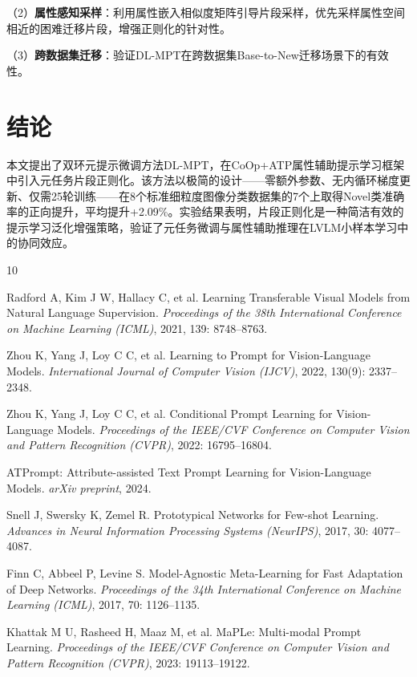 \documentclass[10pt,a4paper]{ctexart}
\begin{document}
（2）\textbf{属性感知采样}：利用属性嵌入相似度矩阵引导片段采样，优先采样属性空间相近的困难迁移片段，增强正则化的针对性。

（3）\textbf{跨数据集迁移}：验证DL-MPT在跨数据集Base-to-New迁移场景下的有效性。

\section{结论}

本文提出了双环元提示微调方法DL-MPT，在CoOp+ATP属性辅助提示学习框架中引入元任务片段正则化。该方法以极简的设计——零额外参数、无内循环梯度更新、仅需25轮训练——在8个标准细粒度图像分类数据集的7个上取得Novel类准确率的正向提升，平均提升+2.09\%。实验结果表明，片段正则化是一种简洁有效的提示学习泛化增强策略，验证了元任务微调与属性辅助推理在LVLM小样本学习中的协同效应。

\vspace{0.5cm}

\begin{thebibliography}{10}

Radford A, Kim J W, Hallacy C, et al.
Learning Transferable Visual Models from Natural Language Supervision.
\textit{Proceedings of the 38th International Conference on Machine Learning (ICML)}, 2021, 139: 8748--8763.

Zhou K, Yang J, Loy C C, et al.
Learning to Prompt for Vision-Language Models.
\textit{International Journal of Computer Vision (IJCV)}, 2022, 130(9): 2337--2348.

Zhou K, Yang J, Loy C C, et al.
Conditional Prompt Learning for Vision-Language Models.
\textit{Proceedings of the IEEE/CVF Conference on Computer Vision and Pattern Recognition (CVPR)}, 2022: 16795--16804.

ATPrompt: Attribute-assisted Text Prompt Learning for Vision-Language Models.
\textit{arXiv preprint}, 2024.

Snell J, Swersky K, Zemel R.
Prototypical Networks for Few-shot Learning.
\textit{Advances in Neural Information Processing Systems (NeurIPS)}, 2017, 30: 4077--4087.

Finn C, Abbeel P, Levine S.
Model-Agnostic Meta-Learning for Fast Adaptation of Deep Networks.
\textit{Proceedings of the 34th International Conference on Machine Learning (ICML)}, 2017, 70: 1126--1135.

Khattak M U, Rasheed H, Maaz M, et al.
MaPLe: Multi-modal Prompt Learning.
\textit{Proceedings of the IEEE/CVF Conference on Computer Vision and Pattern Recognition (CVPR)}, 2023: 19113--19122.

\end{thebibliography}
\end{document}

